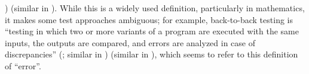 \begin{enumerate}
              \citealp[pp.~17\=/18 to 17\=/19, 18\=/7 to 18\=/8]{SWEBOK2024})%
          \else \cite[p.~128]{IEEE2010} (similar in
              \cite[pp.~17\=/18 to 17\=/19, 18\=/7 to 18\=/8]{SWEBOK2024})\fi.
          While this is a widely used definition, particularly in mathematics,
          it makes some test approaches ambiguous; for example, back-to-back
          testing is ``testing in which two or more variants of a program are
          executed with the same inputs, the outputs are compared, and errors
          are analyzed in case of discrepancies'' \ifnotpaper
              (\citealp[p.~30]{IEEE2010}; similar in \citealpISTQB{})\else
              \cite[p.~30]{IEEE2010} (similar in \cite{ISTQB})\fi,
          which seems to refer to this definition of ``error''.


\end{enumerate}
